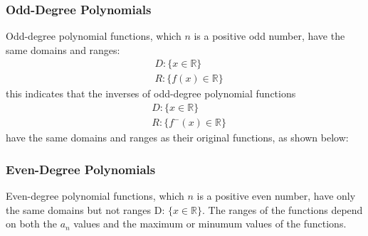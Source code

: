 \documentclass[12pt, titlepage]{article}
\begin{document}
        \subsubsection{Odd-Degree Polynomials}
            Odd-degree polynomial functions, which $n$ is a positive odd number, have the same domains and ranges:
            \begin{align*}
                &D: \{x\in\mathbb{R}\}\\
                &R: \{f(x)\in\mathbb{R}\}
            \end{align*}
            this indicates that the inverses of odd-degree polynomial functions
            \begin{align*}
                &D: \{x\in\mathbb{R}\}\\
                &R: \{f^-(x)\in\mathbb{R}\}
            \end{align*}
            have the same domains and ranges as their original functions, as shown below:
        \begin{center}
        \end{center}
        
        \subsubsection{Even-Degree Polynomials}
        Even-degree polynomial functions, which $n$ is a positive even number, have only the same domains but not ranges D: $\{x\in\mathbb{R}\}$.
        The ranges of the functions depend on both the $a_n$ values and the maximum or minumum values of the functions. 
\end{document}
